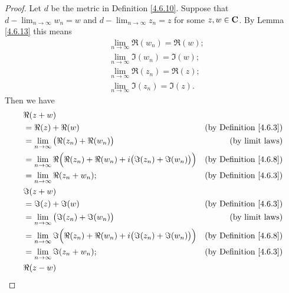 \begin{proof}
    Let \(d\) be the metric in Definition \ref{4.6.10}.
    Suppose that \(d - \lim_{n \to \infty} w_n = w\) and \(d - \lim_{n \to \infty} z_n = z\) for some \(z, w \in \mathbf{C}\).
    By Lemma \ref{4.6.13} this means
    \begin{align*}
         & \lim_{n \to \infty} \Re(w_n) = \Re(w); \\
         & \lim_{n \to \infty} \Im(w_n) = \Im(w); \\
         & \lim_{n \to \infty} \Re(z_n) = \Re(z); \\
         & \lim_{n \to \infty} \Im(z_n) = \Im(z).
    \end{align*}
    Then we have
    \begin{align*}
         & \Re(z + w)                                                                                                                    \\
         & = \Re(z) + \Re(w)                                                                        & \text{(by Definition \ref{4.6.3})} \\
         & = \lim_{n \to \infty} \big(\Re(z_n) + \Re(w_n)\big)                                      & \text{(by limit laws)}             \\
         & = \lim_{n \to \infty} \Re\Big(\Re(z_n) + \Re(w_n) + i \big(\Im(z_n) + \Im(w_n)\big)\Big) & \text{(by Definition \ref{4.6.8})} \\
         & = \lim_{n \to \infty} \Re(z_n + w_n);                                                    & \text{(by Definition \ref{4.6.3})} \\
         & \Im(z + w)                                                                                                                    \\
         & = \Im(z) + \Im(w)                                                                        & \text{(by Definition \ref{4.6.3})} \\
         & = \lim_{n \to \infty} \big(\Im(z_n) + \Im(w_n)\big)                                      & \text{(by limit laws)}             \\
         & = \lim_{n \to \infty} \Im\Big(\Re(z_n) + \Re(w_n) + i \big(\Im(z_n) + \Im(w_n)\big)\Big) & \text{(by Definition \ref{4.6.8})} \\
         & = \lim_{n \to \infty} \Im(z_n + w_n);                                                    & \text{(by Definition \ref{4.6.3})} \\
         & \Re(z - w)                                                                                                                    \\

\end{align*}
\end{proof}
